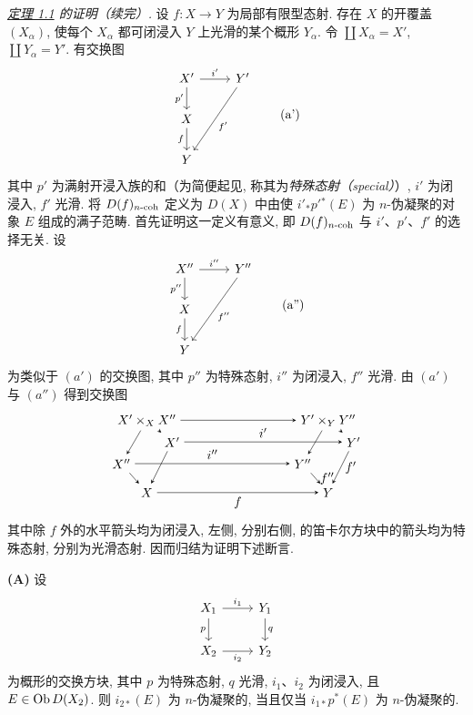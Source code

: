 \emph{\hyperlink{sga6.e03.thm.1-1}{定理 1.1} 的证明（续完）.} 设 \(f:X\to Y\) 为局部有限型态射. 存在 \(X\) 的开覆盖 \((X_\alpha)\), 使每个 \(X_\alpha\) 都可闭浸入 $Y$ 上光滑的某个概形 \(Y_\alpha\). 令 \(\coprod X_\alpha=X'\), \(\coprod Y_\alpha=Y'\). 有交换图
\[
\begin{tikzcd}
X' \arrow[r,"i'"] \arrow[d,"p'"'] & Y' \arrow[ddl,"f'"]\\
X \arrow[d,"f"']\\
Y
\end{tikzcd}\tag{a'}
\]
其中 \(p'\) 为满射开浸入族的和（为简便起见, 称其为\emph{特殊态射（special）}）, \(i'\) 为闭浸入, \(f'\) 光滑. 将 \(D(f)_{n\text{-}\mathrm{coh}}\) 定义为 \(D(X)\) 中由使 \(i'_*p'{}^*(E)\) 为 \(n\)-伪凝聚的对象 \(E\) 组成的满子范畴. 首先证明这一定义有意义, 即 \(D(f)_{n\text{-}\mathrm{coh}}\) 与 \(i'\)、\(p'\)、\(f'\) 的选择无关. 设
\[
\begin{tikzcd}
X'' \arrow[r,"i''"] \arrow[d,"p''"'] & Y'' \arrow[ddl,"f''"]\\
X \arrow[d,"f"']\\
Y
\end{tikzcd}\tag{a''}
\]
为类似于 \((a')\) 的交换图, 其中 \(p''\) 为特殊态射, \(i''\) 为闭浸入, \(f''\) 光滑. 由 \((a')\) 与 \((a'')\) 得到交换图
\[
\begin{tikzpicture}[>=stealth,baseline=(current bounding box.center)]
\node (A) at (0,2) {$X'\times_X X''$};\node (B) at (-.7,.8) {$X''$};\node (C) at (.7,1.4) {$X'$};\node (D) at (0,0) {$X$};
\node (E) at (5,2) {$Y'\times_Y Y''$};\node (F) at (4.3,.8) {$Y''$};\node (G) at (5.7,1.4) {$Y'$};\node (H) at (5,0) {$Y$};
\draw[->] (A)--(B);\draw[->] (A)--(C);\draw[->] (B)--(D);\draw[->] (C)--(D);\draw[->] (E)--(F);\draw[->] (E)--(G);\draw[->] (F)--node[right]{$f''$}(H);\draw[->] (G)--node[right]{$f'$}(H);
\draw[->] (A)--(E);\draw[->] (B)--node[above]{$i''$}(F);\draw[->] (C)--node[above]{$i'$}(G);\draw[->] (D)--node[below]{$f$}(H);
\end{tikzpicture}
\]
其中除 \(f\) 外的水平箭头均为闭浸入, 左侧, 分别右侧, 的笛卡尔方块中的箭头均为特殊态射, 分别为光滑态射. 因而归结为证明下述断言.

\textbf{(A)} 设
\[
\begin{tikzcd}
X_1 \arrow[r,"i_1"] \arrow[d,"p"'] & Y_1 \arrow[d,"q"]\\
X_2 \arrow[r,"i_2"'] & Y_2
\end{tikzcd}
\]
为概形的交换方块, 其中 \(p\) 为特殊态射, \(q\) 光滑, \(i_1\)、\(i_2\) 为闭浸入, 且 \(E\in \operatorname{Ob} D(X_2)\). 则 \(i_{2*}(E)\) 为 \(n\)-伪凝聚的, 当且仅当 \(i_{1*}p^*(E)\) 为 \(n\)-伪凝聚的.

